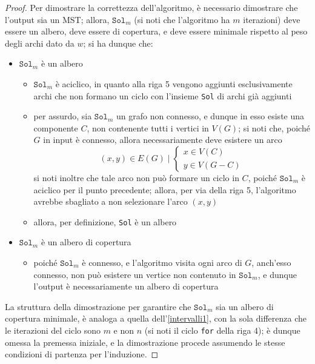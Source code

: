 \documentclass[14pt]{extreport}
\theoremstyle{definition}
\theoremstyle{definition}
\begin{document}
\begin{proof}
    Per dimostrare la correttezza dell'algoritmo, è necessario dimostrare che l'output sia un MST; allora, $\texttt{Sol}_m$ (si noti che l'algoritmo ha $m$ iterazioni) deve essere un albero, deve essere di copertura, e deve essere minimale rispetto al peso degli archi dato da $w$; si ha dunque che:

    \begin{itemize}
        \item $\texttt{Sol}_m$ è un albero
            \begin{itemize}
                \item $\texttt{Sol}_m$ è aciclico, in quanto alla riga 5 vengono aggiunti esclusivamente archi che non formano un ciclo con l'insieme \texttt{Sol} di archi già aggiunti
                \item per assurdo, sia $\texttt{Sol}_m$ un grafo non connesso, e dunque in esso esiste una componente $C$, non contenente tutti i vertici in $V(G)$; si noti che, poiché $G$ in input è connesso, allora necessariamente deve esistere un arco $$(x, y) \in E(G) \mid \left \{ \begin{array}{l} x \in V(C) \\ y \in V(G - C) \end{array} \right.$$ si noti inoltre che tale arco non può formare un ciclo in $C$, poiché $\texttt{Sol}_m$ è aciclico per il punto precedente; allora, per via della riga 5, l'algoritmo avrebbe sbagliato a non selezionare l'arco $(x, y)$
                \item allora, per definizione, \texttt{Sol} è un albero
            \end{itemize}
        \item $\texttt{Sol}_m$ è un albero di copertura
            \begin{itemize}
                \item poiché $\texttt{Sol}_m$ è connesso, e l'algoritmo visita ogni arco di $G$, anch'esso connesso, non può esistere un vertice non contenuto in $\texttt{Sol}_m$, e dunque l'output è necessariamente un albero di copertura
            \end{itemize}
    \end{itemize}

    La struttura della dimostrazione per garantire che $\texttt{Sol}_m$ sia un albero di copertura minimale, è analoga a quella dell'\cref{intervalli1}, con la sola differenza che le iterazioni del ciclo sono $m$ e non $n$ (si noti il ciclo \texttt{for} della riga 4); è dunque omessa la premessa iniziale, e la dimostrazione procede assumendo le stesse condizioni di partenza per l'induzione.


\end{proof}
\end{document}
